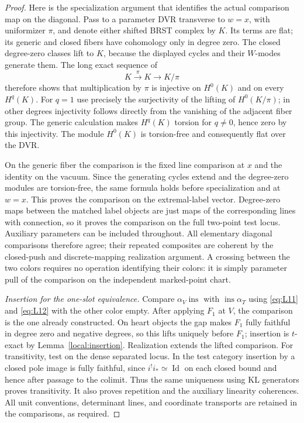 \documentclass[11pt]{article}
\numberwithin{equation}{section}
\theoremstyle{definition}
\theoremstyle{remark}
\begin{document}
\begin{proof}
Here is the specialization argument that identifies the actual
comparison map on the diagonal.  Pass to a parameter DVR transverse
to $w=x$, with uniformizer $\pi$, and denote either shifted BRST
complex by $K$.  Its terms are flat; its generic and closed fibers
have cohomology only in degree zero.  The closed degree-zero
classes lift to $K$, because the displayed cycles and their
$W$-modes generate them.  The long exact sequence of
\[
                      K\xrightarrow{\pi}K\longrightarrow K/\pi
\]
therefore shows that multiplication by $\pi$ is injective on
$H^0(K)$ and on every $H^q(K)$.  For $q=1$ use precisely the
surjectivity of the lifting of $H^0(K/\pi)$; in other degrees
injectivity follows directly from the vanishing of the adjacent
fiber group.  The generic calculation makes $H^q(K)$ torsion
for $q\ne0$, hence zero by this injectivity.  The module $H^0(K)$
is torsion-free and consequently flat over the DVR.

On the generic fiber the comparison is the fixed line comparison
at $x$ and the identity on the vacuum.  Since the generating cycles
extend and the degree-zero modules are torsion-free, the same
formula holds before specialization and at $w=x$.  This proves
the comparison on the extremal-label vector.  Degree-zero maps
between the matched label objects are just maps of the
corresponding lines with connection, so it proves the comparison
on the full two-point test locus.  Auxiliary parameters can be
included throughout.  All elementary diagonal comparisons
therefore agree; their repeated composites are coherent by the
closed-push and discrete-mapping realization argument.  A crossing
between the two colors requires no operation identifying their
colors: it is simply parameter pull of the comparison on the
independent marked-point chart.

\smallskip
\noindent\emph{Insertion for the one-slot equivalence.}
Compare $\alpha_V\operatorname{ins}$ with
$\operatorname{ins}\alpha_T$ using \eqref{eq:L11} and
\eqref{eq:L12} with the other color empty.  After applying $F_1$
at $V$, the comparison is the one already constructed.  On heart
objects the gap makes $F_1$ fully faithful in degree zero and
negative degrees, so this lifts uniquely before $F_1$; insertion
is $t$-exact by Lemma~\ref{local:insertion}.  Realization extends
the lifted comparison.  For transitivity, test on the dense
separated locus.  In the test category insertion by a closed
pole image is fully faithful, since $i^!i_*\simeq\operatorname{Id}$
on each closed bound and hence after passage to the colimit.
Thus the same uniqueness using KL generators proves transitivity.
It also proves repetition and the auxiliary linearity coherences.
All unit conventions, determinant lines, and coordinate transports
are retained in the comparisons, as required.
\end{proof}
\end{document}
